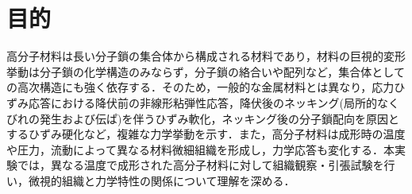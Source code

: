 \section{目的}

高分子材料は長い分子鎖の集合体から構成される材料であり，材料の巨視的変形挙動は分子鎖の化学構造のみならず，分子鎖の絡合いや配列など，集合体としての高次構造にも強く依存する．そのため，一般的な金属材料とは異なり，応力ひずみ応答における降伏前の非線形粘弾性応答，降伏後のネッキング(局所的なくびれの発生および伝ぱ)を伴うひずみ軟化，ネッキング後の分子鎖配向を原因とするひずみ硬化など，複雑な力学挙動を示す．また，高分子材料は成形時の温度や圧力，流動によって異なる材料微細組織を形成し，力学応答も変化する．本実験では，異なる温度で成形された高分子材料に対して組織観察・引張試験を行い，微視的組織と力学特性の関係について理解を深める．